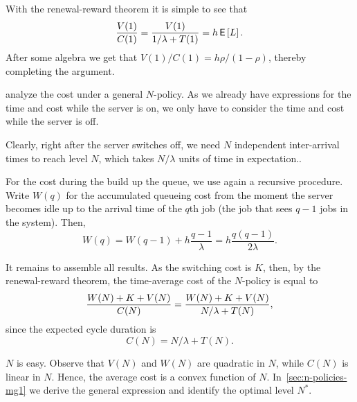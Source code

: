 With  the renewal-reward theorem it is simple to see that
\begin{equation*}
  \frac{V(1)}{C(1)} = \frac{V(1)}{1/\lambda + T(1)} = h \,\mathsf{E}\left[L\right].
\end{equation*}
After some algebra we get that $V(1)/C(1)=h\rho/(1-\rho)$, thereby completing the argument.

 analyze the cost under a general $N$-policy.
As we already have expressions for the time and cost while the server is on, we only have to consider the time and cost while the server is off.

Clearly, right after the server switches off, we need $N$ independent inter-arrival times to reach level $N$, which takes $N/\lambda$ units of time in expectation..

For the cost during the build up the queue, we use again a recursive procedure.
Write $W(q)$ for the accumulated queueing cost
from the moment the server becomes idle up to the arrival time of the $q$th job (the job that sees $q-1$ jobs in the system).
Then,
\begin{equation}\label{eq:99}
  W(q) = W(q-1) +  h\frac{q-1}{\lambda}= h \frac{q(q-1)}{2\lambda}.
\end{equation}

It remains to assemble all results.
As the switching cost is $K$, then, by the renewal-reward theorem, the time-average cost of the $N$-policy is equal to
\begin{align*}
  \frac{W(N)+K+V(N)}{C(N)} =
  \frac{W(N)+K+V(N)}{N/\lambda + T(N)},
\end{align*}
since the expected cycle duration is
\begin{equation*}
C(N) = N/\lambda + T(N).
\end{equation*}

 $N$ is easy.
Observe that $V(N)$ and $W(N)$ are quadratic in $N$, while $C(N)$ is linear in $N$.
Hence, the average cost is a convex function of $N$.
In~\cref{sec:n-policies-mg1} we derive the general expression and identify the optimal level $N^*$.


